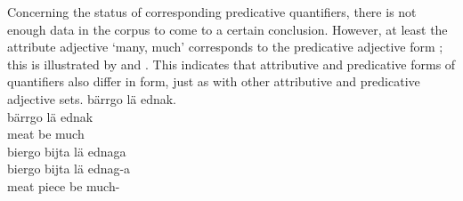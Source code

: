 Concerning the status of corresponding predicative quantifiers, there is not enough data in the corpus to come to a certain conclusion. However, at least the attribute adjective  ‘many, much’ corresponds to the predicative adjective form ; 
this is illustrated by  and . This indicates that attributive and predicative forms of quantifiers also differ in form, just as with other attributive and predicative adjective sets. 
\ea\label{quantifierEx4a}
\glll	bärrgo lä ednak.\\
	bärrgo lä ednak\\
	meat\BS{} be\BS{} much\BS{}\\
{}	
\z
\ea\label{quantifierEx4b}
\glll	biergo bijta lä ednaga\\
	biergo bijta lä ednag-a\\
	meat\BS{} piece\BS{} be\BS{} much-\\
{}	
\z
{}


